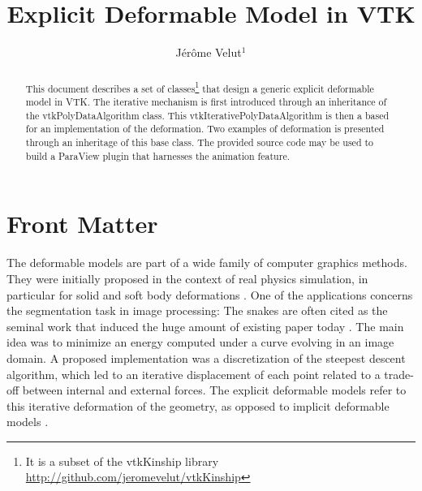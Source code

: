 \documentclass{InsightArticle}
\title{Explicit Deformable Model in VTK}
\author{J\'er\^ome Velut$^{1}$}
\newcommand{\IJhandlerIDnumber}{Xxxx}
\begin{document}
%
% 
\IJhandlefooter{\IJhandlerIDnumber}


\ifpdf
\else
\fi


\maketitle


\ifhtml
\chapter*{Front Matter\label{front}}
\fi


\begin{abstract}
\noindent
This document describes a set of classes\footnote{It is a subset of the
vtkKinship library \url{http://github.com/jeromevelut/vtkKinship}} that 
design a generic explicit deformable model in VTK. The iterative mechanism
is first introduced through an inheritance of the vtkPolyDataAlgorithm class. 
This vtkIterativePolyDataAlgorithm is then a based for an implementation of the
deformation. Two examples of deformation is presented through an inheritage of
this base class. The provided source code may be used to build a ParaView plugin
that harnesses the animation feature.
\end{abstract}

\IJhandlenote{\IJhandlerIDnumber}

\tableofcontents

The deformable models are part of a wide family of computer graphics methods.
They were initially proposed in the context of real physics simulation, 
in particular for solid and soft body deformations \cite{TERXX}. One of the
applications concerns the segmentation task in image processing:
The snakes \cite{KAS87} are often cited as the seminal work that induced the
huge amount of existing paper today \cite{MON01}. The main idea was to minimize
an energy computed under a curve evolving in an image domain. A proposed 
implementation was a discretization of the steepest descent algorithm, which
led to an iterative displacement of each point related to a trade-off between
internal and external forces. The explicit deformable models refer to this 
iterative deformation of the geometry, as opposed to implicit deformable
models \cite{}.
\end{document}
